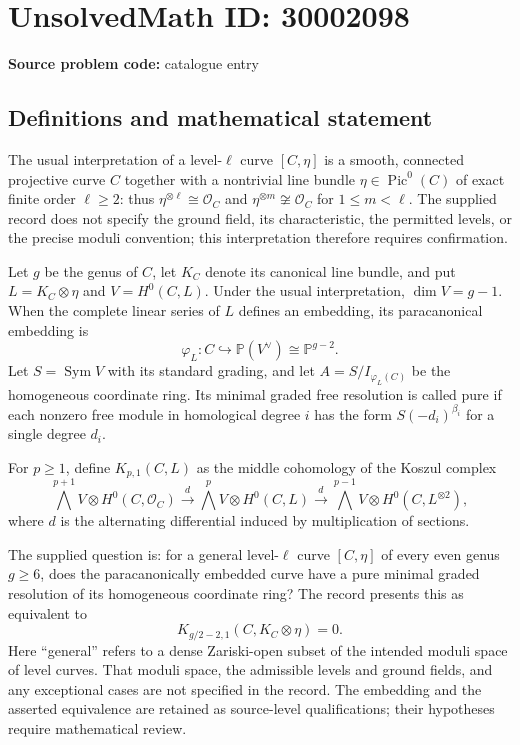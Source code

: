 \documentclass[11pt]{article}
\begin{document}
\section*{UnsolvedMath ID: 30002098}
\textbf{Source problem code:} catalogue entry
\subsection{Definitions and mathematical statement}
The usual interpretation of a level-$\ell$ curve $[C,\eta]$ is a smooth, connected projective curve $C$ together with a nontrivial line bundle $\eta\in\operatorname{Pic}^{0}(C)$ of exact finite order $\ell\geq2$: thus $\eta^{\otimes\ell}\cong\mathcal O_C$ and $\eta^{\otimes m}\not\cong\mathcal O_C$ for $1\leq m<\ell$. The supplied record does not specify the ground field, its characteristic, the permitted levels, or the precise moduli convention; this interpretation therefore requires confirmation.

Let $g$ be the genus of $C$, let $K_C$ denote its canonical line bundle, and put $L=K_C\otimes\eta$ and $V=H^0(C,L)$. Under the usual interpretation, $\dim V=g-1$. When the complete linear series of $L$ defines an embedding, its paracanonical embedding is
\[
\varphi_L:C\hookrightarrow\mathbb P(V^{\vee})\cong\mathbb P^{g-2}.
\]
Let $S=\operatorname{Sym}V$ with its standard grading, and let $A=S/I_{\varphi_L(C)}$ be the homogeneous coordinate ring. Its minimal graded free resolution is called pure if each nonzero free module in homological degree $i$ has the form $S(-d_i)^{\beta_i}$ for a single degree $d_i$.

For $p\geq1$, define $K_{p,1}(C,L)$ as the middle cohomology of the Koszul complex
\[
\bigwedge^{p+1}V\otimes H^0(C,\mathcal O_C)
\xrightarrow{d}
\bigwedge^pV\otimes H^0(C,L)
\xrightarrow{d}
\bigwedge^{p-1}V\otimes H^0(C,L^{\otimes2}),
\]
where $d$ is the alternating differential induced by multiplication of sections.

The supplied question is: for a general level-$\ell$ curve $[C,\eta]$ of every even genus $g\geq6$, does the paracanonically embedded curve have a pure minimal graded resolution of its homogeneous coordinate ring? The record presents this as equivalent to
\[
K_{g/2-2,1}(C,K_C\otimes\eta)=0.
\]
Here ``general'' refers to a dense Zariski-open subset of the intended moduli space of level curves. That moduli space, the admissible levels and ground fields, and any exceptional cases are not specified in the record. The embedding and the asserted equivalence are retained as source-level qualifications; their hypotheses require mathematical review.
\end{document}
